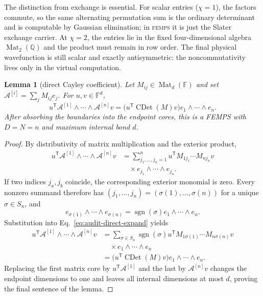 \documentclass[aps,pra,reprint,superscriptaddress,nofootinbib,longbibliography,showkeys]{revtex4-2}
\newtheorem{lemma}[theorem]{Lemma}
\theoremstyle{definition}
\newcommand{\Mat}{\operatorname{Mat}}
\newcommand{\CDet}{\operatorname{CDet}}
\newcommand{\FEMPS}{\textnormal{\textsc{femps}}}
\begin{document}
The distinction from exchange is essential.  For scalar entries ($\chi=1$),
the factors commute, so the same alternating permutation sum is the ordinary
determinant and is computable by Gaussian elimination; in \FEMPS{} it is just
the Slater exchange carrier.  At $\chi=2$, the entries lie in the fixed
four-dimensional algebra $\Mat_2(\mathbb Q)$ and the product must remain in row
order.  The final physical wavefunction is still scalar and exactly
antisymmetric: the noncommutativity lives only in the virtual computation.

\begin{lemma}[direct Cayley coefficient]
Let $M_{ij}\in\Mat_d(\mathbb F)$ and set
$\mathcal A^{[i]}=\sum_jM_{ij}e_j$.  For $u,v\in\mathbb F^d$,
\[
 u^{\mathsf T}\mathcal A^{[1]}\wedge\cdots\wedge
 \mathcal A^{[n]}v
 =\bigl(u^{\mathsf T}\CDet(M)v\bigr)
 e_1\wedge\cdots\wedge e_n.
 \label{eq:direct-cayley}
\]
After absorbing the boundaries into the endpoint cores, this is a FEMPS with
$D=N=n$ and maximum internal bond $d$.
\end{lemma}

\begin{proof}
By distributivity of matrix multiplication and the exterior product,
\begin{align}
u^{\mathsf T}\mathcal A^{[1]}\wedge\cdots\wedge
\mathcal A^{[n]}v
&=\sum_{j_1,\ldots,j_n=1}^{n}
u^{\mathsf T}M_{1j_1}\cdots M_{nj_n}v\nonumber\\
&\quad\times e_{j_1}\wedge\cdots\wedge e_{j_n}.
\label{eq:audit-direct-expand}
\end{align}
If two indices $j_a,j_b$ coincide, the corresponding exterior monomial is
zero.  Every nonzero summand therefore has
$(j_1,\ldots,j_n)=(\sigma(1),\ldots,\sigma(n))$ for a unique
$\sigma\in S_n$, and
\begin{equation}
e_{\sigma(1)}\wedge\cdots\wedge e_{\sigma(n)}
=\operatorname{sgn}(\sigma)e_1\wedge\cdots\wedge e_n.
\end{equation}
Substitution into Eq.~\eqref{eq:audit-direct-expand} yields
\begin{align}
u^{\mathsf T}\mathcal A^{[1]}\wedge\cdots\wedge
\mathcal A^{[n]}v
&=\sum_{\sigma\in S_n}\operatorname{sgn}(\sigma)
u^{\mathsf T}M_{1\sigma(1)}\cdots M_{n\sigma(n)}v\nonumber\\
&\quad\times e_1\wedge\cdots\wedge e_n\nonumber\\
&=\bigl(u^{\mathsf T}\CDet(M)v\bigr)
e_1\wedge\cdots\wedge e_n.
\end{align}
Replacing the first matrix core by $u^{\mathsf T}\mathcal A^{[1]}$ and the
last by $\mathcal A^{[n]}v$ changes the endpoint dimensions to one and leaves
all internal dimensions at most $d$, proving the final sentence of the lemma.
\end{proof}
\end{document}
